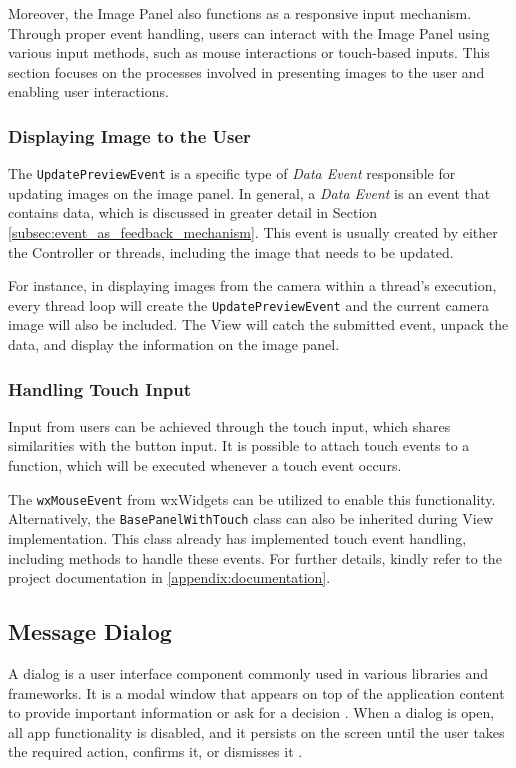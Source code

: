 Moreover, the Image Panel also functions as a responsive input mechanism. Through proper event handling, users can interact with the Image Panel using various input methods, such as mouse interactions or touch-based inputs. This section focuses on the processes involved in presenting images to the user and enabling user interactions.

\subsubsection{Displaying Image to the User}
The \texttt{UpdatePreviewEvent} is a specific type of \textit{Data Event} responsible for updating images on the image panel. In general, a \textit{Data Event} is an event that contains data, which is discussed in greater detail in Section \ref{subsec:event_as_feedback_mechanism}. This event is usually created by either the Controller or threads, including the image that needs to be updated.

For instance, in displaying images from the camera within a thread's execution, every thread loop will create the \texttt{UpdatePreviewEvent} and the current camera image will also be included. The View will catch the submitted event, unpack the data, and display the information on the image panel.

\subsubsection{Handling Touch Input}
\label{subsubsec:handling_touch_input}
Input from users can be achieved through the touch input, which shares similarities with the button input. It is possible to attach touch events to a function, which will be executed whenever a touch event occurs.

The \texttt{wxMouseEvent} from wxWidgets can be utilized to enable this functionality. Alternatively, the \texttt{BasePanelWithTouch} class can also be inherited during View implementation. This class already has implemented touch event handling, including methods to handle these events. For further details, kindly refer to the project documentation in \ref{appendix:documentation}.

\subsection{Message Dialog}
\label{subsec:message_dialog}

A dialog is a user interface component commonly used in various libraries and frameworks. It is a modal window that appears on top of the application content to provide important information or ask for a decision \cite{Bay_2022}. When a dialog is open, all app functionality is disabled, and it persists on the screen until the user takes the required action, confirms it, or dismisses it \cite{Bay_2022}.

